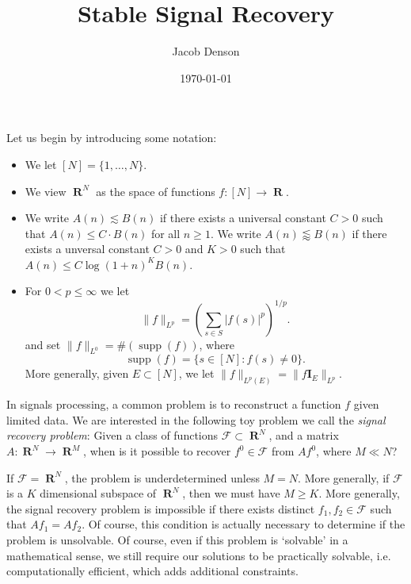 \documentclass{article}
\title{Stable Signal Recovery}
\author{Jacob Denson}
\date{\today}
\theoremstyle{plain}
\DeclareMathOperator{\RR}{\mathbf{R}}
\DeclareMathOperator{\supp}{supp}
\begin{document}
\maketitle

Let us begin by introducing some notation:
%
\begin{itemize}
    \item We let $[N] = \{ 1, \dots, N \}$.
    \item We view $\RR^N$ as the space of functions $f: [N] \to \RR$.
    \item We write $A(n) \lesssim B(n)$ if there exists a universal constant $C > 0$ such that $A(n) \leq C \cdot B(n)$ for all $n \geq 1$. We write $A(n) \lessapprox B(n)$ if there exists a unversal constant $C > 0$ and $K > 0$ such that $A(n) \leq C \log(1 + n)^K B(n)$.
    \item For $0 < p \leq \infty$ we let
    \[ \| f \|_{L^p} = \left( \sum_{s \in S} |f(s)|^p \right)^{1/p}. \]
    and set $\| f \|_{L^0} = \#(\supp(f))$, where
    \[ \supp(f) = \{ s \in [N]: f(s) \neq 0 \}. \]
    More generally, given $E \subset [N]$, we let $\| f \|_{L^p(E)} = \| f \mathbf{I}_E \|_{L^p}$.
\end{itemize}

In signals processing, a common problem is to reconstruct a function $f$ given limited data. We are interested in the following toy problem we call the \emph{signal recovery problem}: Given a class of functions $\mathcal{F} \subset \RR^N$, and a matrix $A: \RR^N \to \RR^M$, when is it possible to recover $f^0 \in \mathcal{F}$ from $Af^0$, where $M \ll N$?

If $\mathcal{F} = \RR^N$, the problem is underdetermined unless $M = N$. More generally, if $\mathcal{F}$ is a $K$ dimensional subspace of $\RR^N$, then we must have $M \geq K$. More generally, the signal recovery problem is impossible if there exists distinct $f_1,f_2 \in \mathcal{F}$ such that $Af_1 = Af_2$. Of course, this condition is actually necessary to determine if the problem is unsolvable. Of course, even if this problem is `solvable' in a mathematical sense, we still require our solutions to be practically solvable, i.e. computationally efficient, which adds additional constraints.
\end{document}
